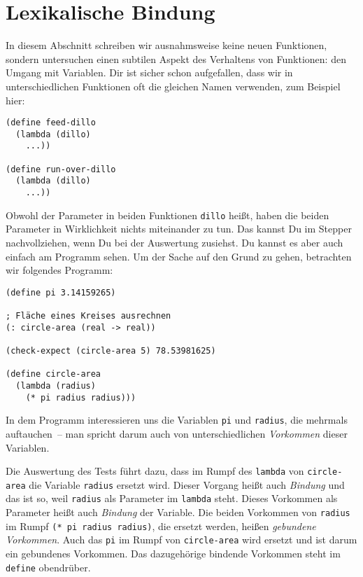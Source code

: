 \section{Lexikalische Bindung}
\label{sec:lexikalische-bindung}


In diesem Abschnitt schreiben wir ausnahmsweise keine neuen
Funktionen, sondern untersuchen einen subtilen Aspekt des Verhaltens
von Funktionen: den Umgang mit Variablen.  Dir ist sicher schon
aufgefallen, dass wir in unterschiedlichen Funktionen oft die gleichen
Namen verwenden, zum Beispiel hier:
%
\begin{lstlisting}
(define feed-dillo
  (lambda (dillo)
    ...))

(define run-over-dillo
  (lambda (dillo)
    ...))
\end{lstlisting}
%
Obwohl der Parameter in beiden Funktionen \lstinline{dillo} heißt,
haben die beiden Parameter in Wirklichkeit nichts miteinander zu tun.
Das kannst Du im Stepper nachvollziehen, wenn Du bei der Auswertung
zusiehst.  Du kannst es aber auch einfach am Programm sehen.  Um der
Sache auf den Grund zu gehen, betrachten wir folgendes Programm:
%
\begin{lstlisting}
(define pi 3.14159265)

; Fläche eines Kreises ausrechnen
(: circle-area (real -> real))

(check-expect (circle-area 5) 78.53981625)

(define circle-area
  (lambda (radius)
    (* pi radius radius)))
\end{lstlisting}
%
In dem Programm interessieren uns die Variablen \lstinline{pi} und
\lstinline{radius}, die mehrmals auftauchen~-- man spricht darum auch
von unterschiedlichen \textit{Vorkommen} dieser
Variablen.

Die Auswertung des Tests führt dazu, dass im Rumpf des
\lstinline{lambda} von \lstinline{circle-area} die Variable
\lstinline{radius} ersetzt wird.  Dieser Vorgang heißt auch
\textit{Bindung} und das ist so, weil
\lstinline{radius} als Parameter im \lstinline{lambda} steht.  Dieses
Vorkommen als Parameter heißt auch \textit{Bindung} der Variable.  Die beiden
Vorkommen von \lstinline{radius} im Rumpf
\lstinline{(* pi radius radius)}, die ersetzt werden,
heißen \textit{gebundene
  Vorkommen}.  Auch das \lstinline{pi} im
Rumpf von \lstinline{circle-area} wird ersetzt und ist darum ein
gebundenes Vorkommen.  Das dazugehörige bindende Vorkommen steht im
\lstinline{define} obendrüber.

